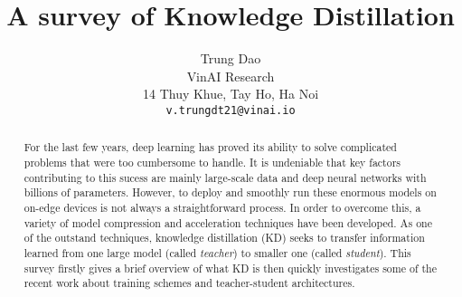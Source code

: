 \documentclass[10pt,twocolumn,letterpaper]{article}
\begin{document}
\title{A survey of Knowledge Distillation}

\author{Trung Dao\\
VinAI Research\\
14 Thuy Khue, Tay Ho, Ha Noi\\
{\tt\small v.trungdt21@vinai.io}
}

\maketitle

\begin{abstract}
   For the last few years, deep learning has proved its ability to solve complicated problems that were too cumbersome to handle. It is undeniable that key factors contributing to this sucess are mainly large-scale data and deep neural networks with billions of parameters. However, to deploy and smoothly run these enormous models on on-edge devices is not always a straightforward process. In order to overcome this, a variety of model compression and acceleration techniques have been developed. As one of the outstand techniques, knowledge distillation (KD) seeks to transfer information learned from one large model (called \textit{teacher}) to smaller one (called \textit{student}). This survey firstly gives a brief overview of what KD is then quickly investigates some of the recent work about training schemes and teacher-student architectures.
\end{abstract}







{\small


}
\end{document}
